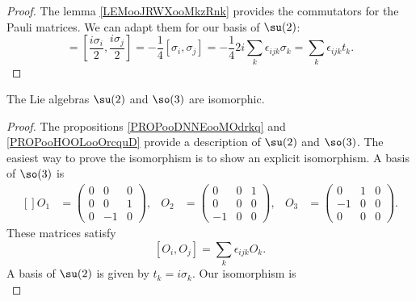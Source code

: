\begin{proof}
    The lemma \ref{LEMooJRWXooMkzRnk} provides the commutators for the Pauli matrices. We can adapt them for our basis of \( \su(2)\):
    \begin{equation}
        [t_i,t_j]=[\frac{ i\sigma_i }{2}, \frac{ i\sigma_j }{2}]=-\frac{1}{ 4 }[\sigma_i,\sigma_j]=-\frac{1}{ 4 }2i\sum_k\epsilon_{ijk}\sigma_k=\sum_k\epsilon_{ijk}t_k.
    \end{equation}
\end{proof}

\begin{proposition}
    The Lie algebras \( \su(2)\) and \( \so(3)\) are isomorphic.
\end{proposition}

\begin{proof}
    The propositions \ref{PROPooDNNEooMOdrkq} and \ref{PROPooHOOLooOrcquD} provide a description of \( \su(2)\) and \( \so(3)\). The easiest way to prove the isomorphism is to show an explicit isomorphism. A basis of \( \so(3)\) is
    \begin{equation}
        \begin{aligned}[]
            O_1&=\begin{pmatrix}
                0    &   0    &   0    \\
                0    &   0    &   1    \\
                0    &   -1    &   0
            \end{pmatrix},&O_2&=\begin{pmatrix}
                0    &   0    &   1    \\
                0    &   0    &   0    \\
                -1    &   0    &   0
            \end{pmatrix},&O_3&=\begin{pmatrix}
                0    &   1    &   0    \\
                -1    &   0    &   0    \\
                0    &   0    &   0
            \end{pmatrix}.
        \end{aligned}
    \end{equation}
    These matrices satisfy
    \begin{equation}        \label{EQooWJMUooOtFAkW}
        [O_i,O_j]=\sum_k\epsilon_{ijk}O_k.
    \end{equation}
    A basis of \( \su(2)\) is given by \( t_k=i\sigma_k\). Our isomorphism is
    \begin{equation}

\end{equation}
\end{proof}
